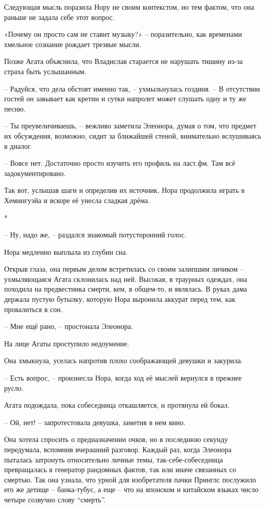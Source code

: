 \documentclass[
  a5paperpaper,
  DIV=11,
  numbers=noendperiod]{scrreprt}
\begin{document}
Следующая мысль поразила Нору не своим контекстом, но тем фактом, что
она раньше не задала себе этот вопрос.

«Почему он просто сам не ставит музыку?» -- поразительно, как временами
хмельное сознание рождает трезвые мысли.

Позже Агата объяснила, что Владислав старается не нарушать тишину из-за
страха быть услышанным.

-- Радуйся, что дела обстоят именно так, -- ухмыльнулась гоздиня. -- В
отсутствии гостей он завывает как кретин и сутки напролет может слушать
одну и ту же песню.

-- Ты преувеличиваешь, -- вежливо заметила Элеонора, думая о том, что
предмет их обсуждения, возможно, сидит за ближайшей стеной, внимательно
вслушиваясь в диалог.

-- Вовсе нет. Достаточно просто изучить его профиль на ласт.фм. Там всё
задокументировано.

Так вот, услышав шаги и определив их источник, Нора продолжила играть в
Хемингуэйа и вскоре её унесла сладкая дрёма.

*

-- Ну, надо же, -- раздался знакомый потусторонний голос.

Нора медленно выплыла из глубин сна.

Открыв глаза, она первым делом встретилась со своим залипшим личиком --
ухмыляющаяся Агата склонилась над ней. Высокая, в траурных одеждах, она
походила на предвестника смерти, кем, в общем-то, и являлась. В руках
дама держала пустую бутылку, которую Нора выронила аккурат перед тем,
как провалиться в сон.

-- Мне ещё рано, -- простонала Элеонора.

На лице Агаты проступило недоумение.

Она хмыкнула, уселась напротив плохо соображающей девушки и закурила.

-- Есть вопрос, -- произнесла Нора, когда ход её мыслей вернулся в
прежнее русло.

Агата подождала, пока собеседница откашляется, и протянула ей бокал.

-- Ой, нет! -- запротестовала девушка, заметив в нем вино.

Она хотела спросить о предназначении очков, но в последнюю секунду
передумала, вспомнив вчерашний разговор. Каждый раз, когда Элеонора
пыталась затронуть относительно личные темы, так-себе-собеседница
превращалась в генератор рандомных фактов, так или иначе связанных со
смертью. Так она узнала, что урной для изобретателя пачки Принглс
послужило его же детище -- банка-тубус, а еще -- что на японском и
китайском языках число четыре созвучно слову ``смерть''.
\end{document}
